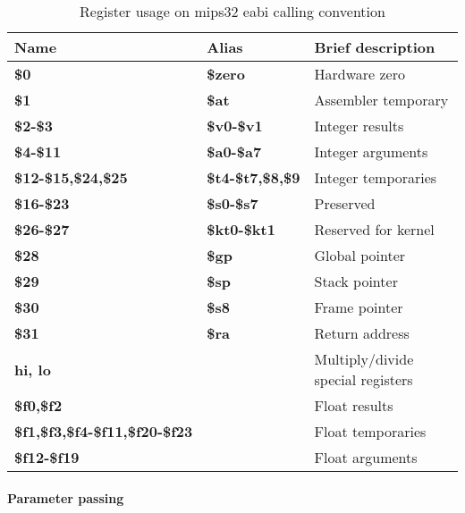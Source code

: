 \begin{table}[h]
\begin{tabular}{lll}
\hline
Name                                   & Alias                   & Brief description\\
\hline
{\bf \$0}                              & {\bf \$zero}            & Hardware zero \\
{\bf \$1}                              & {\bf \$at}              & Assembler temporary \\
{\bf \$2-\$3}                          & {\bf \$v0-\$v1}         & Integer results \\
{\bf \$4-\$11}                         & {\bf \$a0-\$a7}         & Integer arguments\\
{\bf \$12-\$15,\$24,\$25}              & {\bf \$t4-\$t7,\$8,\$9} & Integer temporaries \\
{\bf \$16-\$23}                        & {\bf \$s0-\$s7}         & Preserved \\
{\bf \$26-\$27}                        & {\bf \$kt0-\$kt1}       & Reserved for kernel \\
{\bf \$28}                             & {\bf \$gp}              & Global pointer \\
{\bf \$29}                             & {\bf \$sp}              & Stack pointer \\
{\bf \$30}                             & {\bf \$s8}              & Frame pointer \\
{\bf \$31}                             & {\bf \$ra}              & Return address \\
{\bf hi, lo}                           &                         & Multiply/divide special registers \\
{\bf \$f0,\$f2}                        &                         & Float results \\
{\bf \$f1,\$f3,\$f4-\$f11,\$f20-\$f23} &                         & Float temporaries \\
{\bf \$f12-\$f19}                      &                         & Float arguments \\
\end{tabular}
\caption{Register usage on mips32 eabi calling convention}
\end{table}

\paragraph{Parameter passing}

